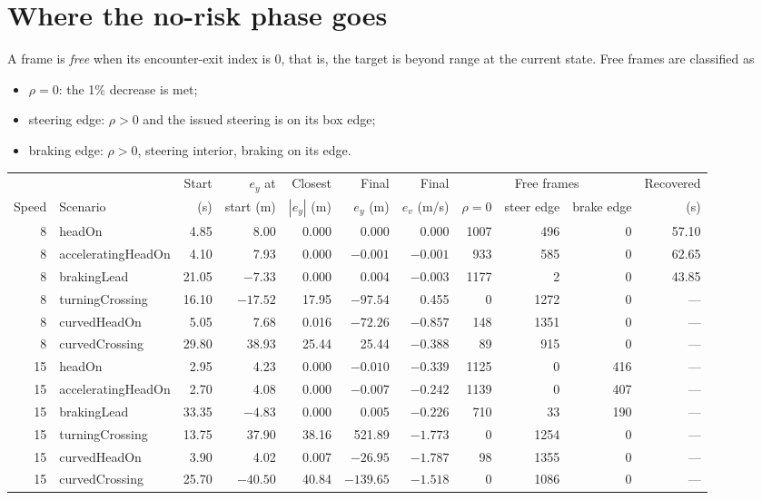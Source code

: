 \documentclass[11pt]{article}
\begin{document}
\section{Where the no-risk phase goes}
A frame is \emph{free} when its encounter-exit index is 0, that is, the target
is beyond range at the current state. Free frames are classified as
\begin{itemize}
\item $\rho=0$: the 1\% decrease is met;
\item steering edge: $\rho>0$ and the issued steering is on its box edge;
\item braking edge: $\rho>0$, steering interior, braking on its edge.
\end{itemize}
\begin{center}\footnotesize\setlength{\tabcolsep}{3pt}
\begin{tabular}{rlrrrrrrrrr}
\toprule
 & & Start & $e_y$ at & Closest & Final & Final & \multicolumn{3}{c}{Free frames} & Recovered\\
Speed & Scenario & (s) & start (m) & $|e_y|$ (m) & $e_y$ (m) & $e_v$ (m/s) & $\rho=0$ & steer edge & brake edge & (s)\\
\midrule
8 & headOn & 4.85 & 8.00 & 0.000 & 0.000 & 0.000 & 1007 & 496 & 0 & 57.10\\
8 & acceleratingHeadOn & 4.10 & 7.93 & 0.000 & $-0.001$ & $-0.001$ & 933 & 585 & 0 & 62.65\\
8 & brakingLead & 21.05 & $-7.33$ & 0.000 & 0.004 & $-0.003$ & 1177 & 2 & 0 & 43.85\\
8 & turningCrossing & 16.10 & $-17.52$ & 17.95 & $-97.54$ & 0.455 & 0 & 1272 & 0 & ---\\
8 & curvedHeadOn & 5.05 & 7.68 & 0.016 & $-72.26$ & $-0.857$ & 148 & 1351 & 0 & ---\\
8 & curvedCrossing & 29.80 & 38.93 & 25.44 & 25.44 & $-0.388$ & 89 & 915 & 0 & ---\\
15 & headOn & 2.95 & 4.23 & 0.000 & $-0.010$ & $-0.339$ & 1125 & 0 & 416 & ---\\
15 & acceleratingHeadOn & 2.70 & 4.08 & 0.000 & $-0.007$ & $-0.242$ & 1139 & 0 & 407 & ---\\
15 & brakingLead & 33.35 & $-4.83$ & 0.000 & 0.005 & $-0.226$ & 710 & 33 & 190 & ---\\
15 & turningCrossing & 13.75 & 37.90 & 38.16 & 521.89 & $-1.773$ & 0 & 1254 & 0 & ---\\
15 & curvedHeadOn & 3.90 & 4.02 & 0.007 & $-26.95$ & $-1.787$ & 98 & 1355 & 0 & ---\\
15 & curvedCrossing & 25.70 & $-40.50$ & 40.84 & $-139.65$ & $-1.518$ & 0 & 1086 & 0 & ---\\
\bottomrule
\end{tabular}\end{center}
\end{document}
